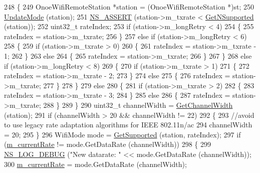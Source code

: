 \begin{DoxyCode}
248 \{
249   OnoeWifiRemoteStation *station = (OnoeWifiRemoteStation *)st;
250   \hyperlink{classns3_1_1OnoeWifiManager_afecc5c3113a6fa42f1d784fec75e3876}{UpdateMode} (station);
251   \hyperlink{assert_8h_a6dccdb0de9b252f60088ce281c49d052}{NS\_ASSERT} (station->m\_txrate < \hyperlink{classns3_1_1WifiRemoteStationManager_a7316bf091ebad5b8cd1a8b5ee47554d8}{GetNSupported} (station));
252   uint32\_t rateIndex;
253   \textcolor{keywordflow}{if} (station->m\_longRetry < 4)
254     \{
255       rateIndex = station->m\_txrate;
256     \}
257   \textcolor{keywordflow}{else} \textcolor{keywordflow}{if} (station->m\_longRetry < 6)
258     \{
259       \textcolor{keywordflow}{if} (station->m\_txrate > 0)
260         \{
261           rateIndex = station->m\_txrate - 1;
262         \}
263       \textcolor{keywordflow}{else}
264         \{
265           rateIndex = station->m\_txrate;
266         \}
267     \}
268   \textcolor{keywordflow}{else} \textcolor{keywordflow}{if} (station->m\_longRetry < 8)
269     \{
270       \textcolor{keywordflow}{if} (station->m\_txrate > 1)
271         \{
272           rateIndex = station->m\_txrate - 2;
273         \}
274       \textcolor{keywordflow}{else}
275         \{
276           rateIndex = station->m\_txrate;
277         \}
278     \}
279   \textcolor{keywordflow}{else}
280     \{
281       \textcolor{keywordflow}{if} (station->m\_txrate > 2)
282         \{
283           rateIndex = station->m\_txrate - 3;
284         \}
285       \textcolor{keywordflow}{else}
286         \{
287           rateIndex = station->m\_txrate;
288         \}
289     \}
290   uint32\_t channelWidth = \hyperlink{classns3_1_1WifiRemoteStationManager_a918213c5b9fa629c4986f6d90521bbd4}{GetChannelWidth} (station);
291   \textcolor{keywordflow}{if} (channelWidth > 20 && channelWidth != 22)
292     \{
293       \textcolor{comment}{//avoid to use legacy rate adaptation algorithms for IEEE 802.11n/ac}
294       channelWidth = 20;
295     \}
296   WifiMode mode = \hyperlink{classns3_1_1WifiRemoteStationManager_a995c8bae0d84b168fd3e8bc9ecaacdd4}{GetSupported} (station, rateIndex);
297   \textcolor{keywordflow}{if} (\hyperlink{classns3_1_1OnoeWifiManager_a5ba916c2f45dd5687c035db25dc86800}{m\_currentRate} != mode.GetDataRate (channelWidth))
298     \{
299       \hyperlink{group__logging_ga413f1886406d49f59a6a0a89b77b4d0a}{NS\_LOG\_DEBUG} (\textcolor{stringliteral}{"New datarate: "} << mode.GetDataRate (channelWidth));
300       \hyperlink{classns3_1_1OnoeWifiManager_a5ba916c2f45dd5687c035db25dc86800}{m\_currentRate} = mode.GetDataRate (channelWidth);

\end{DoxyCode}
